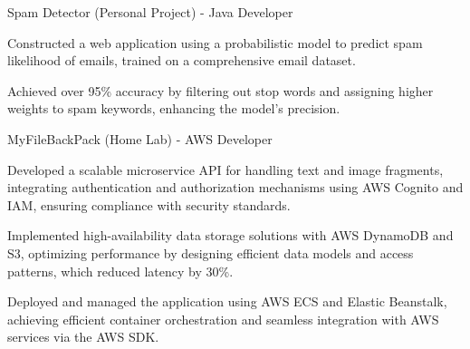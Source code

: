 

\begin{cventries}

\cvproject
{Spam Detector (Personal Project) - Java Developer} %
{} %
{}
{}
{
  \begin{cvitems} %
    \item {Constructed a web application using a probabilistic model to predict spam likelihood of emails, trained on a comprehensive email dataset.}
    \item {Achieved over 95\% accuracy by filtering out stop words and assigning higher weights to spam keywords, enhancing the model's precision.}
  \end{cvitems}
}
\cvproject
{MyFileBackPack (Home Lab) - AWS Developer} %
{} %
{}
{}
{
  \begin{cvitems} %
    \item {Developed a scalable microservice API for handling text and image fragments, integrating authentication and authorization mechanisms using AWS Cognito and IAM, ensuring compliance with security standards.}
    \item {Implemented high-availability data storage solutions with AWS DynamoDB and S3, optimizing performance by designing efficient data models and access patterns, which reduced latency by 30\%.}
    \item {Deployed and managed the application using AWS ECS and Elastic Beanstalk, achieving efficient container orchestration and seamless integration with AWS services via the AWS SDK.}
  \end{cvitems}
}
\vspace{0.225cm} %


\end{cventries}
